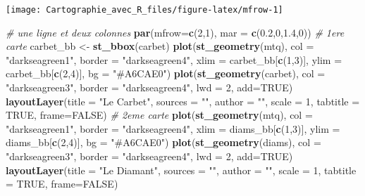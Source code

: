 \documentclass[]{book}
\newenvironment{Shaded}{\begin{snugshade}}{\end{snugshade}}
\newcommand{\KeywordTok}[1]{\textcolor[rgb]{0.13,0.29,0.53}{\textbf{#1}}}
\newcommand{\DataTypeTok}[1]{\textcolor[rgb]{0.13,0.29,0.53}{#1}}
\newcommand{\DecValTok}[1]{\textcolor[rgb]{0.00,0.00,0.81}{#1}}
\newcommand{\FloatTok}[1]{\textcolor[rgb]{0.00,0.00,0.81}{#1}}
\newcommand{\StringTok}[1]{\textcolor[rgb]{0.31,0.60,0.02}{#1}}
\newcommand{\CommentTok}[1]{\textcolor[rgb]{0.56,0.35,0.01}{\textit{#1}}}
\newcommand{\OtherTok}[1]{\textcolor[rgb]{0.56,0.35,0.01}{#1}}
\newcommand{\NormalTok}[1]{#1}
\begin{document}
\begin{center}\texttt{[image: Cartographie\_avec\_R\_files/figure-latex/mfrow-1]} \end{center}

\begin{Shaded}
\begin{Highlighting}[]
\CommentTok{# une ligne et deux colonnes}
\KeywordTok{par}\NormalTok{(}\DataTypeTok{mfrow=}\KeywordTok{c}\NormalTok{(}\DecValTok{2}\NormalTok{,}\DecValTok{1}\NormalTok{), }\DataTypeTok{mar =} \KeywordTok{c}\NormalTok{(}\FloatTok{0.2}\NormalTok{,}\DecValTok{0}\NormalTok{,}\FloatTok{1.4}\NormalTok{,}\DecValTok{0}\NormalTok{))}
\CommentTok{# 1ere carte}
\NormalTok{carbet_bb <-}\StringTok{ }\KeywordTok{st_bbox}\NormalTok{(carbet)}
\KeywordTok{plot}\NormalTok{(}\KeywordTok{st_geometry}\NormalTok{(mtq), }\DataTypeTok{col =} \StringTok{"darkseagreen1"}\NormalTok{, }\DataTypeTok{border =} \StringTok{"darkseagreen4"}\NormalTok{, }
     \DataTypeTok{xlim =}\NormalTok{ carbet_bb[}\KeywordTok{c}\NormalTok{(}\DecValTok{1}\NormalTok{,}\DecValTok{3}\NormalTok{)], }\DataTypeTok{ylim =}\NormalTok{ carbet_bb[}\KeywordTok{c}\NormalTok{(}\DecValTok{2}\NormalTok{,}\DecValTok{4}\NormalTok{)], }\DataTypeTok{bg =} \StringTok{"#A6CAE0"}\NormalTok{)}
\KeywordTok{plot}\NormalTok{(}\KeywordTok{st_geometry}\NormalTok{(carbet), }\DataTypeTok{col =} \StringTok{"darkseagreen3"}\NormalTok{, }\DataTypeTok{border =} \StringTok{"darkseagreen4"}\NormalTok{, }
     \DataTypeTok{lwd =} \DecValTok{2}\NormalTok{, }\DataTypeTok{add=}\OtherTok{TRUE}\NormalTok{)}
\KeywordTok{layoutLayer}\NormalTok{(}\DataTypeTok{title =} \StringTok{"Le Carbet"}\NormalTok{, }\DataTypeTok{sources =} \StringTok{""}\NormalTok{, }\DataTypeTok{author =} \StringTok{""}\NormalTok{, }\DataTypeTok{scale =} \DecValTok{1}\NormalTok{, }
            \DataTypeTok{tabtitle =} \OtherTok{TRUE}\NormalTok{, }\DataTypeTok{frame=}\OtherTok{FALSE}\NormalTok{)}
\CommentTok{# 2eme carte }
\KeywordTok{plot}\NormalTok{(}\KeywordTok{st_geometry}\NormalTok{(mtq), }\DataTypeTok{col =} \StringTok{"darkseagreen1"}\NormalTok{, }\DataTypeTok{border =} \StringTok{"darkseagreen4"}\NormalTok{, }
     \DataTypeTok{xlim =}\NormalTok{ diams_bb[}\KeywordTok{c}\NormalTok{(}\DecValTok{1}\NormalTok{,}\DecValTok{3}\NormalTok{)], }\DataTypeTok{ylim =}\NormalTok{ diams_bb[}\KeywordTok{c}\NormalTok{(}\DecValTok{2}\NormalTok{,}\DecValTok{4}\NormalTok{)], }\DataTypeTok{bg =} \StringTok{"#A6CAE0"}\NormalTok{)}
\KeywordTok{plot}\NormalTok{(}\KeywordTok{st_geometry}\NormalTok{(diams), }\DataTypeTok{col =} \StringTok{"darkseagreen3"}\NormalTok{, }\DataTypeTok{border =} \StringTok{"darkseagreen4"}\NormalTok{, }
     \DataTypeTok{lwd =} \DecValTok{2}\NormalTok{, }\DataTypeTok{add=}\OtherTok{TRUE}\NormalTok{)}
\KeywordTok{layoutLayer}\NormalTok{(}\DataTypeTok{title =} \StringTok{"Le Diamant"}\NormalTok{, }\DataTypeTok{sources =} \StringTok{""}\NormalTok{, }\DataTypeTok{author =} \StringTok{""}\NormalTok{, }\DataTypeTok{scale =} \DecValTok{1}\NormalTok{, }
            \DataTypeTok{tabtitle =} \OtherTok{TRUE}\NormalTok{, }\DataTypeTok{frame=}\OtherTok{FALSE}\NormalTok{)}
\end{Highlighting}
\end{Shaded}
\end{document}
